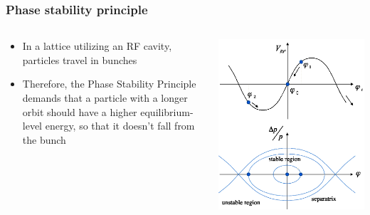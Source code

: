\documentclass{beamer}
\begin{document}
\begin{frame}\frametitle{Phase stability principle}
  \begin{columns}
    \begin{column}{.5\textwidth}
      \begin{itemize}
      \item In a lattice utilizing an RF cavity, particles travel in bunches
      \item Therefore, the Phase Stability Principle demands that a particle with a longer orbit should have a higher equilibrium-level energy, so that it doesn't fall from the bunch
      \end{itemize}
    \end{column}
    \begin{column}{.5\textwidth}
      \centering
      \includegraphics[width=\linewidth]{psp_diagram}
    \end{column}
  \end{columns}
\end{frame}
\end{document}
